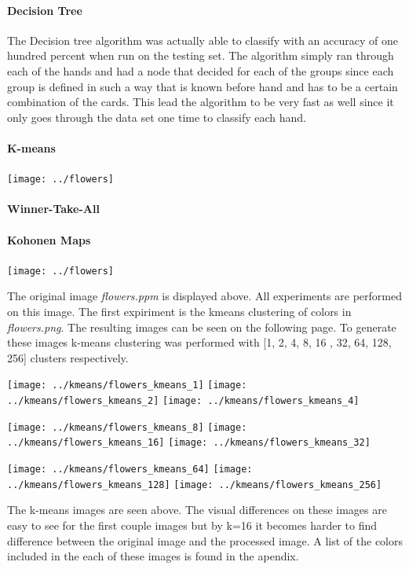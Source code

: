 \documentclass{article}
\begin{document}
\paragraph{Decision Tree}
The Decision tree algorithm was actually able to classify with an accuracy of one hundred percent when run on the testing set. The algorithm simply ran through each of the hands and had a node that decided for each of the groups since each group is defined in such a way that is known before hand and has to be a certain combination of the cards. This lead the algorithm to be very fast as well since it only goes through the data set one time to classify each hand.



\paragraph{K-means}

\centerline{\texttt{[image: ../flowers]}}

\paragraph{Winner-Take-All}
\paragraph{Kohonen Maps}

\centerline{\texttt{[image: ../flowers]}}
The original image \textit{flowers.ppm} is displayed above. All experiments
are performed on this image. The first expiriment is the kmeans clustering
of colors in \textit{flowers.png}. The resulting images can be seen on the following page. To generate these images k-means clustering was performed with [1, 2, 4, 8, 16
, 32, 64, 128, 256] clusters respectively.

\newpage
\centerline{
\texttt{[image: ../kmeans/flowers\_kmeans\_1]}
\texttt{[image: ../kmeans/flowers\_kmeans\_2]}
\texttt{[image: ../kmeans/flowers\_kmeans\_4]}}
\centerline{
\texttt{[image: ../kmeans/flowers\_kmeans\_8]}
\texttt{[image: ../kmeans/flowers\_kmeans\_16]}
\texttt{[image: ../kmeans/flowers\_kmeans\_32]}}
\centerline{
\texttt{[image: ../kmeans/flowers\_kmeans\_64]}
\texttt{[image: ../kmeans/flowers\_kmeans\_128]}
\texttt{[image: ../kmeans/flowers\_kmeans\_256]}}
The k-means images are seen above. The visual differences on these images are 
easy to see for the first couple images but by k=16 it becomes harder to find 
difference between the original image and the processed image. A list of the 
colors included in the each of these images is found in the apendix.
\newpage
\end{document}
